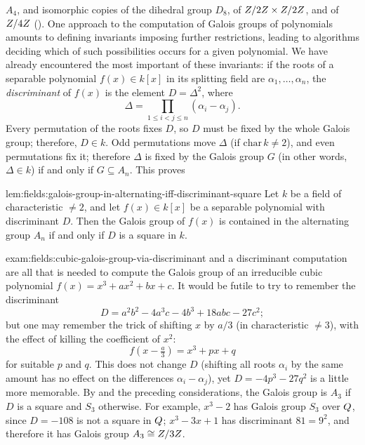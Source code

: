 $A_4$, and isomorphic copies of the dihedral group $D_8$, of
$Z/2Z \times Z/2Z$, and of $Z/4Z$
(). One approach to the
computation of Galois groups of polynomials amounts to defining
invariants imposing further restrictions, leading to algorithms
deciding which of such possibilities occurs for a given polynomial.
We have already encountered the most important of these invariants: if
the roots of a separable polynomial $f(x) \in k[x]$ in its splitting
field are $\alpha_1, \dots, \alpha_n$, the \emph{discriminant} of
$f(x)$ is the element $D = \Delta^2$, where
\[
  \Delta = \prod_{1 \leq i < j \leq n} (\alpha_i - \alpha_j).
\]
Every permutation of the roots fixes $D$, so $D$ must be fixed by the
whole Galois group; therefore, $D \in k$. Odd permutations move
$\Delta$ (if $\mathrm{char}\,k \neq 2$), and even permutations fix it;
therefore $\Delta$ is fixed by the Galois group $G$ (in other words,
$\Delta \in k$) if and only if $G \subseteq A_n$. This proves
\begin{lem}{}{lem:fields:galois-group-in-alternating-iff-discriminant-square}
  Let $k$ be a field of characteristic $\neq 2$, and let
  $f(x) \in k[x]$ be a separable polynomial with discriminant
  $D$. Then the Galois group of $f(x)$ is contained in the alternating
  group $A_n$ if and only if $D$ is a square in $k$.
\end{lem}
\begin{exam}{}{exam:fields:cubic-galois-group-via-discriminant}
   and a discriminant computation are all that
  is needed to compute the Galois group of an irreducible cubic
  polynomial $f(x) = x^3 + ax^2 + bx + c$. It would be futile to try
  to remember the discriminant
  \[
    D = a^2 b^2 - 4a^3 c - 4b^3 + 18abc - 27c^2;
  \]
  but one may remember the trick of shifting $x$ by $a/3$ (in
  characteristic $\neq 3$), with the effect of killing the coefficient
  of $x^2$:
  \[
    f\!\left(x - \tfrac{a}{3}\right) = x^3 + px + q
  \]
  for suitable $p$ and $q$. This does not change $D$ (shifting all
  roots $\alpha_i$ by the same amount has no effect on the differences
  $\alpha_i - \alpha_j$), yet $D = -4p^3 - 27q^2$ is a little more
  memorable. By  and the preceding
  considerations, the Galois group is $A_3$ if $D$ is a square and
  $S_3$ otherwise. For example, $x^3 - 2$ has Galois group $S_3$ over
  $Q$, since $D = -108$ is not a square in $Q$; $x^3 - 3x + 1$ has
  discriminant $81 = 9^2$, and therefore it has Galois group
  $A_3 \cong Z/3Z$.
\end{exam}
